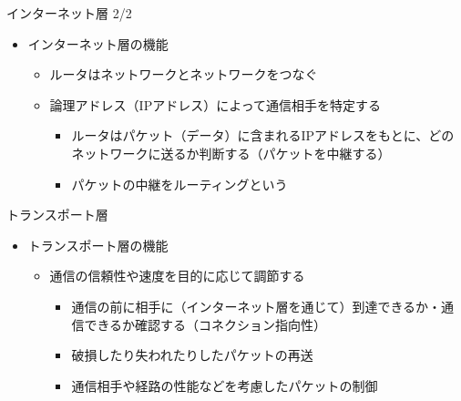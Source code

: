 \documentclass[12pt,aspectratio=169]{beamer}
\begin{document}
\begin{frame}{インターネット層 2/2}

  \begin{itemize}
    \item インターネット層の機能
      \begin{itemize}

        \item ルータはネットワークとネットワークをつなぐ
        \item 論理アドレス（IPアドレス）によって通信相手を特定する
          \begin{itemize}
            \item ルータはパケット（データ）に含まれるIPアドレスをもとに、どのネットワークに送るか判断する（パケットを中継する）
            \item パケットの中継をルーティングという
          \end{itemize}

      \end{itemize}

  \end{itemize}

\end{frame}


\begin{frame}{トランスポート層}

  \begin{itemize}
    \item トランスポート層の機能
      \begin{itemize}
        \item 通信の信頼性や速度を目的に応じて調節する
          \begin{itemize}
            \item 通信の前に相手に（インターネット層を通じて）到達できるか・通信できるか確認する（コネクション指向性）
            \item 破損したり失われたりしたパケットの再送
            \item 通信相手や経路の性能などを考慮したパケットの制御
          \end{itemize}

      \end{itemize}

  \end{itemize}

\end{frame}
\end{document}
